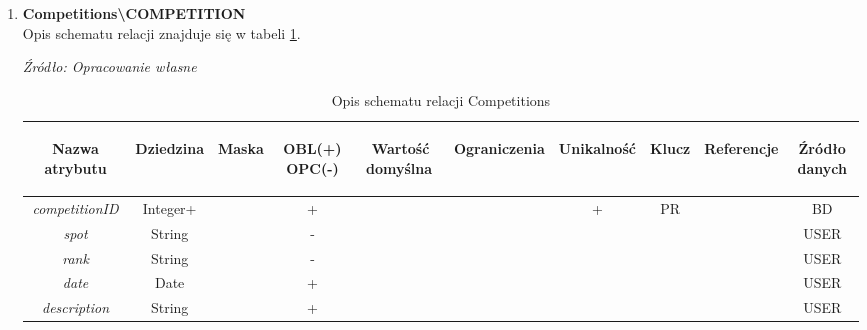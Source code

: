 \documentclass[12pt,twoside]{report}
\begin{document}
\begin{enumerate}[start=1,label={\bfseries REL\textbackslash0\arabic*}]
	\item \textbf{Competitions\textbackslash COMPETITION} \\
Opis schematu relacji znajduje się w tabeli \ref{CompetitionsRelationSchema}.
\begin{table}[h!]
	\caption{Opis schematu relacji Competitions}
	\textit{Źródło: Opracowanie własne}
	\label{CompetitionsRelationSchema}
	\centering
	\begin{tabular}{|c|c|c|c|c|c|c|c|c|c|}
		\hline
		\begin{sideways}Nazwa atrybutu\end{sideways}& 
		\begin{sideways}Dziedzina \end{sideways}& 
		\begin{sideways}Maska \end{sideways}& 
		\begin{sideways}OBL(+) OPC(-)\end{sideways} & 
		\begin{sideways}Wartość domyślna$\ $\end{sideways}& 
		\begin{sideways}Ograniczenia\end{sideways} &
		\begin{sideways}Unikalność \end{sideways}& 
		\begin{sideways}Klucz \end{sideways}& 
		\begin{sideways}Referencje \end{sideways}&
		\begin{sideways}Źródło danych\end{sideways}\\
		\hline
		\textit{competitionID} & Integer+ & & + & & & + & PR & &BD\\
		\hline
		\textit{spot} & String & & - & & & & & &USER\\
		\hline
		\textit{rank} & String & & - & & & & & &USER\\
		\hline
		\textit{date} & Date & & + & & & & & &USER\\
		\hline
		\textit{description}  & String & & + & & & & & &USER\\
		\hline		
	\end{tabular}
\end{table}


\end{enumerate}
\end{document}
